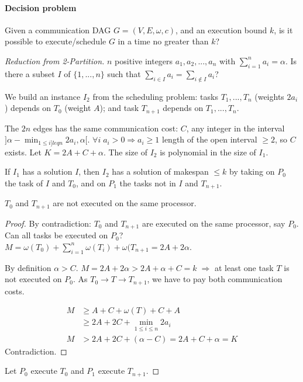 \paragraph{Decision problem}
Given a communication DAG $G=(V,E,\omega,c)$, and an execution bound $k$, is it possible to execute/schedule $G$ in a time no greater than $k$?

\begin{proof}[Reduction from 2-Partition]
$n$ positive integers $a_1,a_2,...,a_n$ with $\sum_{i=1}^n a_i = \alpha$. Is there a subset $I$ of $\{1,...,n\}$ such that $\sum_{i\in I} a_i = \sum_{i \notin I} a_i$?

We build an instance $I_2$ from the scheduling problem: tasks $T_1,...,T_n$ (weights $2a_i$) depends on $T_0$ (weight $A$); and task $T_{n+1}$ depends on $T_1,...,T_n$.

The $2n$ edges has the same communication cost: $C$, any integer in the interval $]\alpha - \min_{1\leq i ]leq n} 2a_i, \alpha[$. $\forall i \; a_i>0 \Rightarrow a_i \geq 1$ length of the open interval $\geq 2$, so $C$ exists. Let $K=2A+C+\alpha$. The size of $I_2$ is polynomial in the size of $I_1$.

If $I_1$ has a solution $I$, then $I_2$ has a solution of makespan $\leq k$ by taking on $P_0$ the task of $I$ and $T_0$, and on $P_1$ the tasks not in $I$ and $T_{n+1}$.

\begin{lemma}
$T_0$ and $T_{n+1}$ are not executed on the same processor.
\end{lemma}

\begin{proof}
By contradiction: $T_0$ and $T_{n+1}$ are executed on the same processor, say $P_0$. Can all tasks be executed on $P_0$? $M=\omega(T_0)+\sum_{i=1}^n \omega(T_i) + \omega(T_{n+1}=2A+2\alpha$.

By definition $\alpha > C$. $M=2A+2\alpha> 2A+\alpha+C=k \; \Rightarrow$ at least one task $T$ is not executed on $P_0$. As $T_0 \to T \to T_{n+1}$, we have to pay both communication costs.


\begin{align*}
M & \geq A + C + \omega(T) + C + A\\
& \geq 2A + 2C + \min_{1\leq i\leq n}2a_i\\
M & > 2A + 2C+(\alpha-C)=2A+C+\alpha=K
\end{align*}
Contradiction.
\end{proof}

Let $P_0$ execute $T_0$ and $P_1$ execute $T_{n+1}$.


\end{proof}

